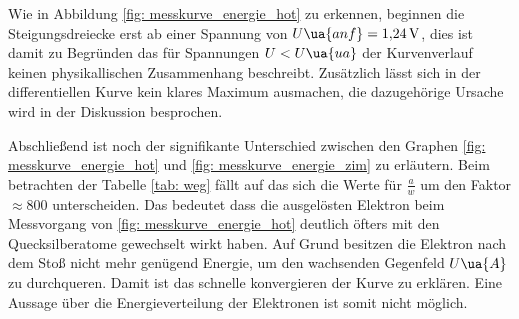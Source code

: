 Wie in Abbildung \ref{fig: messkurve_energie_hot} zu erkennen, beginnen die Steigungsdreiecke erst ab
einer Spannung von $U\ua{anf}=\SI{1.24}{\volt}$, dies ist damit zu Begründen das für Spannungen $U<U\ua{ua}$
der Kurvenverlauf keinen physikallischen Zusammenhang beschreibt.
Zusätzlich lässt sich in der differentiellen Kurve kein klares Maximum ausmachen, die dazugehörige Ursache wird in
der Diskussion besprochen.

Abschließend ist noch der signifikante Unterschied zwischen den Graphen \ref{fig: messkurve_energie_hot} und \ref{fig: messkurve_energie_zim}
zu erläutern. Beim betrachten der Tabelle \ref{tab: weg} fällt auf das sich die Werte für $\frac{a}{w}$ um den Faktor $\approx 800$ unterscheiden.
Das bedeutet dass die ausgelösten Elektron beim Messvorgang von \ref{fig: messkurve_energie_hot} deutlich öfters mit den
Quecksilberatome gewechselt wirkt haben. Auf Grund besitzen die Elektron nach dem Stoß nicht mehr genügend
Energie, um den wachsenden Gegenfeld $U\ua{A}$ zu durchqueren. Damit ist das schnelle konvergieren der Kurve zu erklären.
Eine Aussage über die Energieverteilung der Elektronen ist somit nicht möglich.
\FloatBarrier
